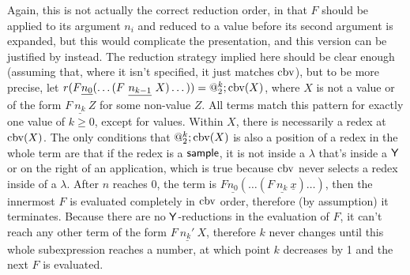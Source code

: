 Again, this is not actually the correct reduction order, in that $F$ should be applied to its argument $n_i$ and reduced to a value before its second argument is expanded, but this would complicate the presentation, and this version can be justified by  instead. The reduction strategy implied here should be clear enough (assuming that, where it isn't specified, it just matches $\operatorname{cbv}$), but to be more precise, let $r(F \underline{n_0} (\dots(F\ \underline {n_{k-1}}\ X)\dots)) = @_2^k;\cbv(X)$, where $X$ is not a value or of the form $F\ \underline{n_k}\ Z$ for some non-value $Z$. All terms match this pattern for exactly one value of $k \geq 0$, except for values. Within $X$, there is necessarily a redex at $\operatorname{cbv}(X)$. The only conditions that $@_2^k;\operatorname{cbv}(X)$ is also a position of a redex in the whole term are that if the redex is a $\mathsf{sample}$, it is not inside a $\lambda$ that's inside a $\mathsf{Y}$ or on the right of an application, which is true because $\operatorname{cbv}$ never selects a redex inside of a $\lambda$. After $n$ reaches $0$, the term is $F \underline{n_0} (\dots(F\ \underline {n_k}\ \underline x)\dots)$, then the innermost $F$ is evaluated completely in $\operatorname{cbv}$ order, therefore (by assumption) it terminates. Because there are no $\mathsf{Y}$-reductions in the evaluation of $F$, it can't reach any other term of the form $F\ \underline{n_k'}\ X$, therefore $k$ never changes until this whole subexpression reaches a number, at which point $k$ decreases by 1 and the next $F$ is evaluated.


\antitoneSeemsComplete*

